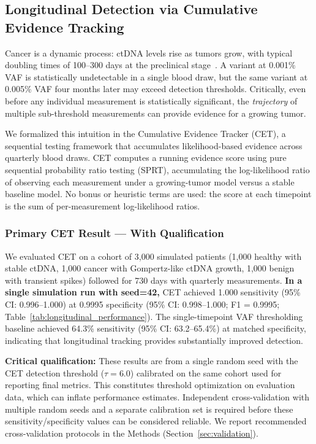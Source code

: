 \documentclass[10pt,a4paper]{article}
\begin{document}
\subsection{Longitudinal Detection via Cumulative Evidence Tracking}

Cancer is a dynamic process: ctDNA levels rise as tumors grow, with typical doubling times of 100--300 days at the preclinical stage~\cite{avanzini2020mathematical}. A variant at 0.001\% VAF is statistically undetectable in a single blood draw, but the same variant at 0.005\% VAF four months later may exceed detection thresholds. Critically, even before any individual measurement is statistically significant, the \textit{trajectory} of multiple sub-threshold measurements can provide evidence for a growing tumor.

We formalized this intuition in the Cumulative Evidence Tracker (CET), a sequential testing framework that accumulates likelihood-based evidence across quarterly blood draws. CET computes a running evidence score using pure sequential probability ratio testing (SPRT), accumulating the log-likelihood ratio of observing each measurement under a growing-tumor model versus a stable baseline model. No bonus or heuristic terms are used: the score at each timepoint is the sum of per-measurement log-likelihood ratios.

\subsubsection{Primary CET Result — With Qualification}

We evaluated CET on a cohort of 3,000 simulated patients (1,000 healthy with stable ctDNA, 1,000 cancer with Gompertz-like ctDNA growth, 1,000 benign with transient spikes) followed for 730 days with quarterly measurements. \textbf{In a single simulation run with seed=42,} CET achieved 1.000 sensitivity (95\% CI: 0.996--1.000) at 0.9995 specificity (95\% CI: 0.998--1.000; F1 = 0.9995; Table~\ref{tab:longitudinal_performance}). The single-timepoint VAF thresholding baseline achieved 64.3\% sensitivity (95\% CI: 63.2--65.4\%) at matched specificity, indicating that longitudinal tracking provides substantially improved detection.

\textbf{Critical qualification:} These results are from a single random seed with the CET detection threshold ($\tau = 6.0$) calibrated on the same cohort used for reporting final metrics. This constitutes threshold optimization on evaluation data, which can inflate performance estimates. Independent cross-validation with multiple random seeds and a separate calibration set is required before these sensitivity/specificity values can be considered reliable. We report recommended cross-validation protocols in the Methods (Section~\ref{sec:validation}).
\end{document}
